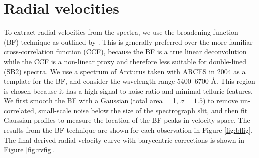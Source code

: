 \section{Radial velocities}\label{rvs}
To extract radial velocities from the spectra, we use the broadening function (BF) technique as outlined by \citet{ruc02}. This is generally preferred over the more familiar cross-correlation function (CCF), because the BF is a true linear deconvolution while the CCF is a non-linear proxy and therefore less suitable for double-lined (SB2) spectra. We use a spectrum of Arcturus taken with ARCES in 2004 as a template for the BF, and consider the wavelength range 5400--6700 \AA. This region is chosen because it has a high signal-to-noise ratio and minimal telluric features. We first smooth the BF with a Gaussian (total area = 1, $\sigma=1.5$) to remove un-correlated, small-scale noise below the size of the spectrograph slit, and then fit Gaussian profiles to measure the location of the BF peaks in velocity space. The results from the BF technique are shown for each observation in Figure \ref{fig:bffig}. The final derived radial velocity curve with barycentric corrections is shown in Figure \ref{fig:rvfig}.
